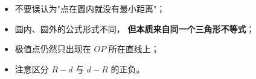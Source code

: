 \begin{trapbox}
\begin{itemize}
  \item 不要误认为"点在圆内就没有最小距离"；
  \item 圆内、圆外的公式形式不同，
  \textbf{但本质来自同一个三角形不等式}；
  \item 极值点仍然只出现在 $OP$ 所在直线上；
  \item 注意区分 $R-d$ 与 $d-R$ 的正负。
\end{itemize}
\end{trapbox}
